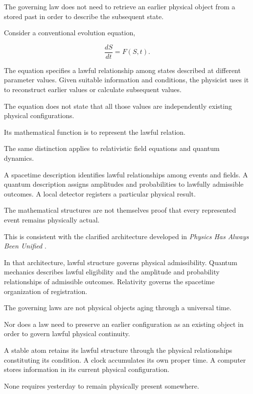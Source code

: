\documentclass[12pt,onecolumn]{article}
\begin{document}
The governing law does not need to retrieve an earlier physical object from a stored past in order to describe the subsequent state.

Consider a conventional evolution equation,

\begin{equation}
\frac{dS}{dt}=F(S,t).
\end{equation}

The equation specifies a lawful relationship among states described at different parameter values. Given suitable information and conditions, the physicist uses it to reconstruct earlier values or calculate subsequent values.

The equation does not state that all those values are independently existing physical configurations.

Its mathematical function is to represent the lawful relation.

The same distinction applies to relativistic field equations and quantum dynamics.

A spacetime description identifies lawful relationships among events and fields. A quantum description assigns amplitudes and probabilities to lawfully admissible outcomes. A local detector registers a particular physical result.

The mathematical structures are not themselves proof that every represented event remains physically actual.

This is consistent with the clarified architecture developed in \emph{Physics Has Always Been Unified} \cite{UnifiedPhysics}.

In that architecture, lawful structure governs physical admissibility. Quantum mechanics describes lawful eligibility and the amplitude and probability relationships of admissible outcomes. Relativity governs the spacetime organization of registration.

The governing laws are not physical objects aging through a universal time.

Nor does a law need to preserve an earlier configuration as an existing object in order to govern lawful physical continuity.

A stable atom retains its lawful structure through the physical relationships constituting its condition. A clock accumulates its own proper time. A computer stores information in its current physical configuration.

None requires yesterday to remain physically present somewhere.
\end{document}
